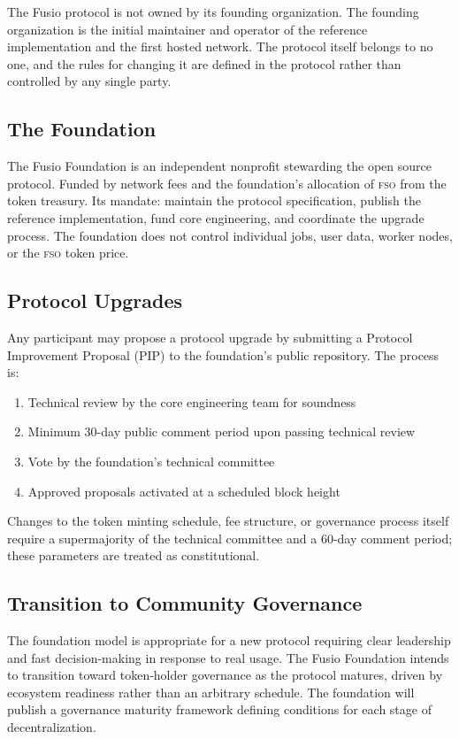 \documentclass[10pt,twocolumn]{article}
\newcommand{\fso}{\textsc{fso}}
\begin{document}
The Fusio protocol is not owned by its founding organization. The founding organization is the initial maintainer and operator of the reference implementation and the first hosted network. The protocol itself belongs to no one, and the rules for changing it are defined in the protocol rather than controlled by any single party.

\subsection{The Foundation}

The Fusio Foundation is an independent nonprofit stewarding the open source protocol. Funded by network fees and the foundation's allocation of \fso{} from the token treasury. Its mandate: maintain the protocol specification, publish the reference implementation, fund core engineering, and coordinate the upgrade process. The foundation does not control individual jobs, user data, worker nodes, or the \fso{} token price.

\subsection{Protocol Upgrades}

Any participant may propose a protocol upgrade by submitting a Protocol Improvement Proposal (PIP) to the foundation's public repository. The process is:
\begin{enumerate}[noitemsep,leftmargin=*,topsep=2pt]
  \item Technical review by the core engineering team for soundness
  \item Minimum 30-day public comment period upon passing technical review
  \item Vote by the foundation's technical committee
  \item Approved proposals activated at a scheduled block height
\end{enumerate}

Changes to the token minting schedule, fee structure, or governance process itself require a supermajority of the technical committee and a 60-day comment period; these parameters are treated as constitutional.

\subsection{Transition to Community Governance}

The foundation model is appropriate for a new protocol requiring clear leadership and fast decision-making in response to real usage. The Fusio Foundation intends to transition toward token-holder governance as the protocol matures, driven by ecosystem readiness rather than an arbitrary schedule. The foundation will publish a governance maturity framework defining conditions for each stage of decentralization.
\end{document}
